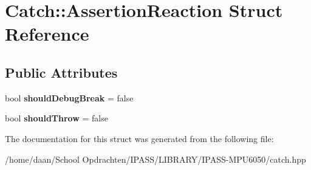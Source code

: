 \hypertarget{structCatch_1_1AssertionReaction}{}\section{Catch\+:\+:Assertion\+Reaction Struct Reference}
\label{structCatch_1_1AssertionReaction}
\subsection*{Public Attributes}
\begin{DoxyCompactItemize}
\item 
\mbox{\label{structCatch_1_1AssertionReaction_adcf30fb90ff20d9789df78d424652497}} 
bool {\bfseries should\+Debug\+Break} = false
\item 
\mbox{\label{structCatch_1_1AssertionReaction_a82c8d95a2c1b6a331bde66982a8e090f}} 
bool {\bfseries should\+Throw} = false
\end{DoxyCompactItemize}


The documentation for this struct was generated from the following file\+:\begin{DoxyCompactItemize}
\item 
/home/daan/\+School Opdrachten/\+I\+P\+A\+S\+S/\+L\+I\+B\+R\+A\+R\+Y/\+I\+P\+A\+S\+S-\/\+M\+P\+U6050/catch.\+hpp\end{DoxyCompactItemize}
